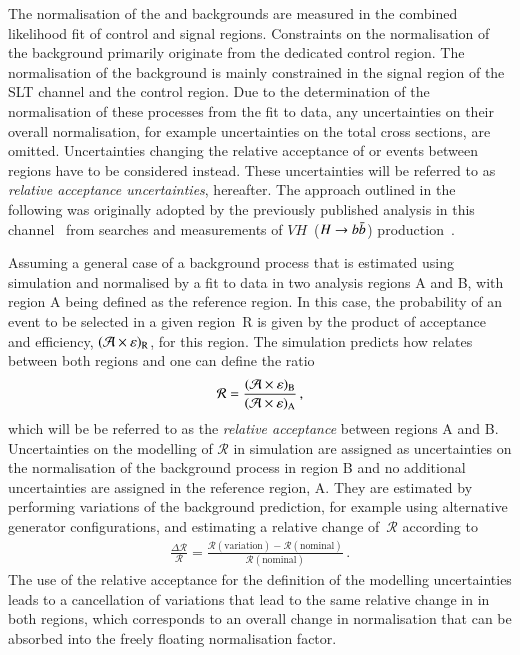 The normalisation of the \ZHF and \ttbar backgrounds are measured in
the combined likelihood fit of control and signal regions. Constraints
on the normalisation of the \ZHF background primarily originate from
the dedicated control region. The normalisation of the \ttbar
background is mainly constrained in the signal region of the \lephad
SLT channel and the \ZHF control region. Due to the determination of
the normalisation of these processes from the fit to data, any
uncertainties on their overall normalisation, for example
uncertainties on the total cross sections, are omitted. Uncertainties
changing the relative acceptance of \ZHF or \ttbar events between
regions have to be considered instead. These uncertainties will be
referred to as \emph{relative acceptance uncertainties},
hereafter. The approach outlined in the following was originally
adopted by the previously published analysis in this
channel~\cite{HIGG-2016-16-witherratum} from searches and measurements
of $VH$~($H\to b\bar{b}$)
production~\cite{HIGG-2016-29,HIGG-2018-04,HIGG-2018-51}.

Assuming a general case of a background process that is estimated
using simulation and normalised by a fit to data in two analysis
regions A and B, with region A being defined as the reference
region. In this case, the probability of an event to be selected in a
given region~R is given by the product of acceptance and efficiency,
$(\mathcal{A} \times \varepsilon)_{\text{R}}$, for this region. The simulation predicts
how \AccTimesEff relates between both regions and one can define the
ratio
\begin{align*}
  \mathcal{R} = \frac{(\mathcal{A} \times \varepsilon)_{\text{B}}}{(\mathcal{A} \times \varepsilon)_{\text{A}}} \,\text{,}
\end{align*}
which will be be referred to as the \emph{relative acceptance} between
regions A and B. Uncertainties on the modelling of $\mathcal{R}$ in
simulation are assigned as uncertainties on the normalisation of the
background process in region B and no
additional uncertainties are assigned in the reference region, A. They
are estimated by performing variations of the background prediction,
for example using alternative generator configurations, and estimating
a relative change of~$\mathcal{R}$ according to
\begin{align}
  \frac{\Delta \mathcal{R}}{\mathcal{R}} = \frac{\mathcal{R}(\text{variation}) - \mathcal{R}(\text{nominal})}{\mathcal{R}(\text{nominal})} \,\text{.}
  \label{eq:relative_acceptance_uncertainty}
\end{align}
The use of the relative acceptance for the definition of the modelling
uncertainties leads to a cancellation of variations that lead to the
same relative change in \AccTimesEff in both regions, which
corresponds to an overall change in normalisation that can be absorbed
into the freely floating normalisation factor.

